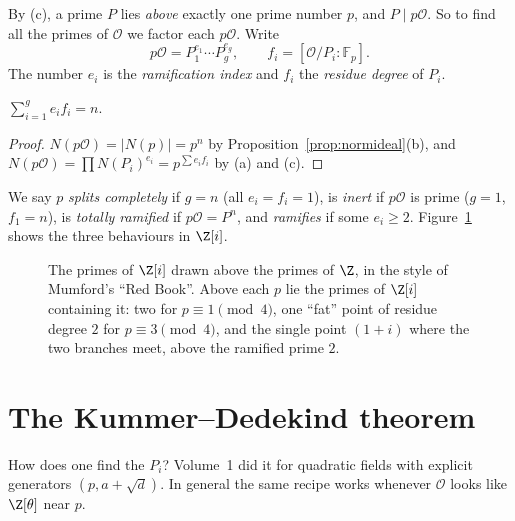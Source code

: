 By (c), a prime $P$ lies \emph{above} exactly one prime number $p$, and $P\mid p\mathcal O$. So to find all the primes of
$\mathcal O$ we factor each $p\mathcal O$. Write
\[
p\mathcal O=P_1^{e_1}\cdots P_g^{e_g},\qquad f_i=[\mathcal O/P_i:\mathbb F_p].
\]
The number $e_i$ is the \emph{ramification index} and $f_i$ the \emph{residue degree} of $P_i$.

\begin{theorem}\label{thm:sumef}
$\displaystyle\sum_{i=1}^ge_if_i=n$.
\end{theorem}
\begin{proof}
$N(p\mathcal O)=|N(p)|=p^n$ by Proposition~\ref{prop:normideal}(b), and $N(p\mathcal O)=\prod N(P_i)^{e_i}=p^{\sum
e_if_i}$ by (a) and (c).
\end{proof}

We say $p$ \emph{splits completely} if $g=n$ (all $e_i=f_i=1$), is \emph{inert} if $p\mathcal O$ is prime ($g=1$,
$f_1=n$), is \emph{totally ramified} if $p\mathcal O=P^n$, and \emph{ramifies} if some $e_i\ge2$. Figure~\ref{fig:spec}
shows the three behaviours in $\Z[i]$.

\begin{figure}[ht]
\centering
{}
\caption{The primes of $\Z[i]$ drawn above the primes of $\Z$, in the style of Mumford's ``Red Book''. Above each $p$
lie the primes of $\Z[i]$ containing it: two for $p\equiv1\pmod 4$, one ``fat'' point of residue degree $2$ for
$p\equiv3\pmod4$, and the single point $(1+i)$ where the two branches meet, above the ramified prime $2$.}
\label{fig:spec}
\end{figure}

\section{The Kummer--Dedekind theorem}

How does one find the $P_i$? Volume~1 did it for quadratic fields with explicit generators $(p,a+\sqrt d)$. In general
the same recipe works whenever $\mathcal O$ looks like $\Z[\theta]$ near $p$.

